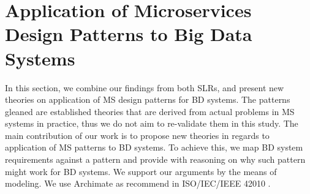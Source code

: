 \documentclass[a4paper,11pt,article,oneside]{memoir}
\begin{document}

        
        

        

        
        

        

             
        

        



\chapter{Application of Microservices Design Patterns to Big Data Systems}


In this section, we combine our findings from both SLRs, and present new theories on application of MS design patterns for BD systems. The patterns gleaned are established theories that are derived from actual problems in MS systems in practice, thus we do not aim to re-validate them in this study. The main contribution of our work is to propose new theories in regards to application of MS patterns to BD systems. To achieve this, we map BD system requirements against a pattern and provide with reasoning on why such pattern might work for BD systems. We support our arguments by the means of modeling. We use Archimate \citep{lankhorst2013language} as recommend in ISO/IEC/IEEE 42010 \citep{Chaabane}. 

\end{document}

